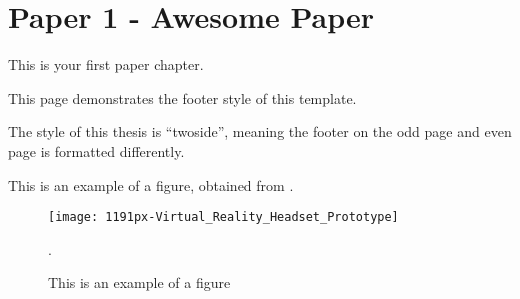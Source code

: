 \chapter{Paper 1 - Awesome Paper}
This is your first paper chapter. 

\newpage
This page demonstrates the footer style of this template. 

\newpage
The style of this thesis is ``twoside'', meaning the footer on the odd page and even page is formatted differently.

\newpage
This is an example of a figure, obtained from \citet{wiki1}. 

\begin{figure}[hb!]
\texttt{[image: 1191px-Virtual\_Reality\_Headset\_Prototype]}
\centering
\caption{This is an example of a figure~\citep{wiki1}}.
\end{figure}